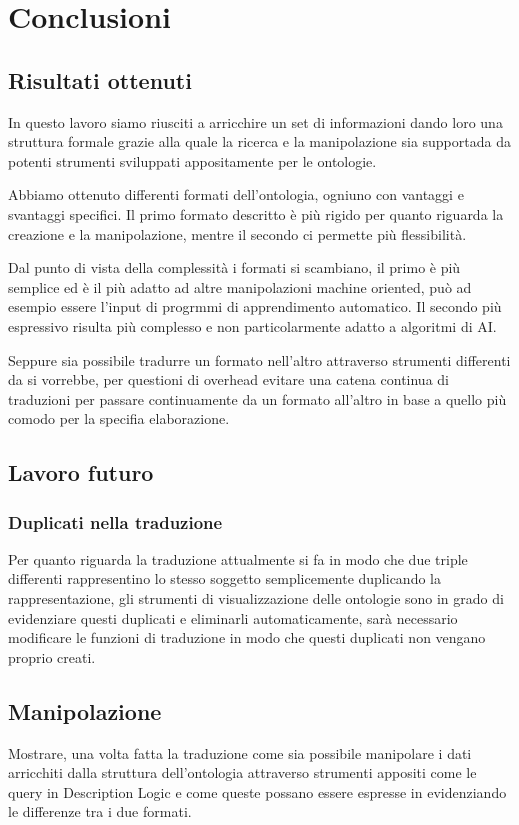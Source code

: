 \section{Conclusioni}
	\subsection{Risultati ottenuti}
	In questo lavoro siamo riusciti a arricchire un set di informazioni dando loro una struttura formale grazie alla quale la ricerca e la manipolazione sia supportada da potenti strumenti sviluppati appositamente per le ontologie. 
	
	Abbiamo ottenuto differenti formati dell'ontologia, ogniuno con vantaggi e svantaggi specifici. Il primo formato descritto è più rigido per quanto riguarda la creazione e la manipolazione, mentre il secondo ci permette più flessibilità.
	
	Dal punto di vista della complessità i formati si scambiano, il primo è più semplice ed è il più adatto ad altre manipolazioni machine oriented, può ad esempio essere l'input di progrmmi di apprendimento automatico. Il secondo più espressivo risulta più complesso e non particolarmente adatto a algoritmi di AI. 
	
	Seppure sia possibile tradurre un formato nell'altro attraverso strumenti differenti da \cduce si vorrebbe, per questioni di overhead evitare una catena continua di traduzioni per passare continuamente da un formato all'altro in base a quello più comodo per la specifia elaborazione.
	\subsection{Lavoro futuro}
		\subsubsection{Duplicati nella traduzione}
			Per quanto riguarda la traduzione attualmente si fa in modo che due triple differenti rappresentino lo stesso soggetto semplicemente duplicando la rappresentazione, gli strumenti di visualizzazione delle ontologie sono in grado di evidenziare questi duplicati e eliminarli automaticamente, sarà necessario modificare le funzioni di traduzione in modo che questi duplicati non vengano proprio creati.
		\subsection{Manipolazione}
			Mostrare, una volta fatta la traduzione come sia possibile manipolare i dati arricchiti dalla struttura dell'ontologia attraverso strumenti appositi come le query in Description Logic e come queste possano essere espresse in \cduce evidenziando le differenze tra i due formati.
